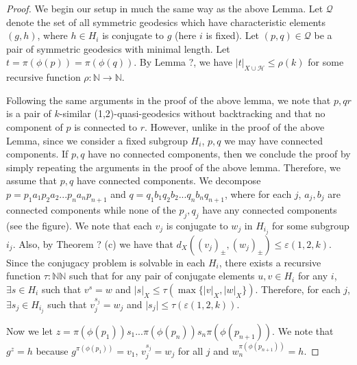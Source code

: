 \documentclass[12pt]{article}
\newcommand{\vs}{\vskip10pt}
\begin{document}
	\begin{proof}
		
		We begin our setup in much the same way as the above Lemma. Let $\mathcal{Q}$ denote the set of all symmetric geodesics which have characteristic elements $(g,h)$, where $h \in H_i$ is conjugate to $g$ (here $i$ is fixed). Let $(p,q) \in \mathcal{Q}$ be a pair of symmetric geodesics with minimal length. Let $t = \pi(\phi(p)) = \pi(\phi(q))$. By Lemma ?, we have $\vert t \vert_{X \cup \mathcal{H}} \leq \rho(k)$ for some recursive function $\rho : \mathbb{N} \rightarrow \mathbb{N}$. 
		
		\vs 
		
		Following the same arguments in the proof of the above lemma, we note that $p, qr$ is a pair of $k$-similar (1,2)-quasi-geodesics without backtracking and that no component of $p$ is connected to $r$. However, unlike in the proof of the above Lemma, since we consider a fixed subgroup $H_i$, $p,q$ we may have connected components. If $p,q$ have no connected components, then we conclude the proof by simply repeating the arguments in the proof of the above lemma. Therefore, we assume that $p,q$ have connected components. We decompose $p = p_1 a_1 p_2 a_2 ... p_n a_n p_{n+1}$ and $q = q_1 b_1 q_2 b_2 ... q_n b_n q_{n+1}$, where for each $j$, $a_j, b_j$ are connected components while none of the $p_j, q_j$ have any connected components (see the figure). We note that each $v_j$ is conjugate to $w_j$ in $H_{i_j}$ for some subgroup $i_j$. Also, by Theorem ? (c) we have that $d_X((v_j)_{\pm}, (w_j)_{\pm}) \leq \varepsilon(1,2,k)$. Since the conjugacy problem is solvable in each $H_i$, there exists a recursive function $\tau: \mathbb{N} \mathbb{N}$ such that for any pair of conjugate elements $u,v \in H_i$ for any $i$, $\exists s \in H_i$ such that $v^s = w$ and $\vert s \vert_X \leq \tau(\max \{\vert v \vert_X, \vert w \vert_X\})$. Therefore, for each $j$, $\exists s_j \in H_{i_j}$ such that $v_j^{s_j} = w_j$ and $\vert s_j \vert \leq \tau(\varepsilon(1,2,k))$. 
		
		\vs 
		
		Now we let $z = \pi(\phi(p_1)) s_1 ... \pi(\phi(p_n)) s_n \pi(\phi(p_{n+1}))$. We note that $g^z = h$ because $g^{\pi(\phi(p_1))} = v_1$, $v_j^{s_j} = w_j$ for all $j$ and $w_n^{\pi(\phi(p_{n+1}))} = h$. 
		
		\vs 
		

\end{proof}
\end{document}
